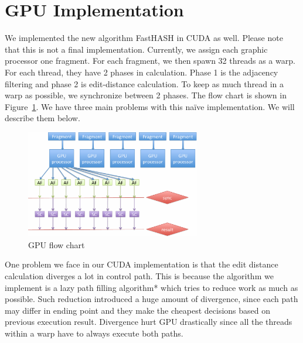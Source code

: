 \section{GPU Implementation} \label{sec:gpu} 

We implemented the new algorithm FastHASH in CUDA as well. Please note that
this is not a final implementation.  Currently, we assign each graphic
processor one fragment. For each fragment, we then spawn 32 threads as a warp.
For each thread, they have 2 phases in calculation. Phase 1 is the adjacency
filtering and phase 2 is edit-distance calculation. To keep as much thread in a
warp as possible, we synchronize between 2 phases. The flow chart is shown in
Figure~\ref{fig:gpu}.  We have three main problems with this naïve implementation. We will
describe them below. \\

\begin{figure}[t]
\centering
\vspace{0.1in}
\includegraphics[width=3in]{./figure/gpu_B.pdf} \vspace{0in}
\caption{GPU flow chart}
\label{fig:gpu}
\end{figure}

One problem we face in our CUDA implementation is that the edit distance
calculation diverges a lot in control path. This is because the algorithm we
implement is a lazy path filling algorithm* which tries to reduce work as much
as possible. Such reduction introduced a huge amount of divergence, since each
path may differ in ending point and they make the cheapest decisions based on
previous execution result. Divergence hurt GPU drastically since all the
threads within a warp have to always execute both paths. \\

